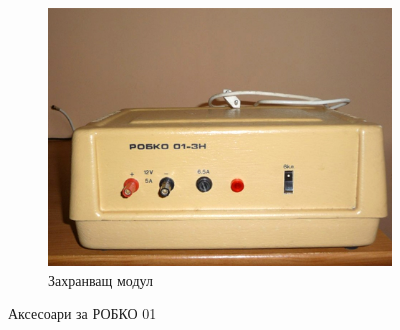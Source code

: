 \begin{figure}
    \begin{subfigure}{0.45\textwidth}
        \centering
        \includegraphics[width=\linewidth]{pictures/robko_psu.jpg}
        \caption{Захранващ модул}
        \label{fig:robko_psu}
    \end{subfigure}
    \caption{Аксесоари за РОБКО 01}
    \label{fig:robko_accessories}
\end{figure}
